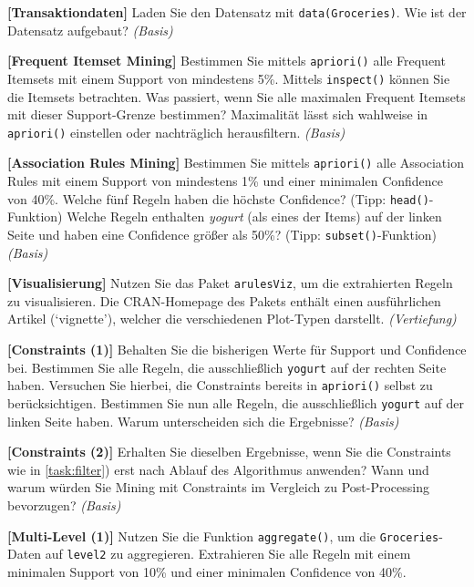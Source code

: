 \documentclass[headinclude,headsepline]{scrartcl}
\newcommand{\taskcategory}[1]{{\color[HTML]{800000}\emph{(#1)}}}
\newcommand{\taskname}[1]{\textbf{[#1]}}
\newcommand{\code}[1]{{\color[HTML]{000080}\texttt{#1}}}
\begin{document}
\begin{compactenum}[a)]\itemsep10pt
	\item
	\taskname{Transaktiondaten}
	Laden Sie den Datensatz mit \code{data(Groceries)}.
	Wie ist der Datensatz aufgebaut?
	\taskcategory{Basis}
	\item
	\taskname{Frequent Itemset Mining}
	Bestimmen Sie mittels \code{apriori()} alle Frequent Itemsets mit einem Support von mindestens 5\%.
	Mittels \code{inspect()} können Sie die Itemsets betrachten.
	Was passiert, wenn Sie alle maximalen Frequent Itemsets mit dieser Support-Grenze bestimmen?
	Maximalität lässt sich wahlweise in \code{apriori()} einstellen oder nachträglich herausfiltern.
	\taskcategory{Basis}
	\item
	\label{task:filter}
	\taskname{Association Rules Mining}
	Bestimmen Sie mittels \code{apriori()} alle Association Rules mit einem Support von mindestens 1\% und einer minimalen Confidence von 40\%.
	Welche fünf Regeln haben die höchste Confidence?
	(Tipp: \code{head()}-Funktion)
	Welche Regeln enthalten \textit{yogurt} (als eines der Items) auf der linken Seite und haben eine Confidence größer als 50\%?
	(Tipp: \code{subset()}-Funktion)
	\taskcategory{Basis}
	\item
	\taskname{Visualisierung}
	Nutzen Sie das Paket \code{arulesViz}, um die extrahierten Regeln zu visualisieren.
	Die CRAN-Homepage des Pakets enthält einen ausführlichen Artikel (`vignette'), welcher die verschiedenen Plot-Typen darstellt.
	\taskcategory{Vertiefung}
	\item
	\taskname{Constraints (1)}
	Behalten Sie die bisherigen Werte für Support und Confidence bei.
	Bestimmen Sie alle Regeln, die ausschließlich \code{yogurt} auf der rechten Seite haben.
	Versuchen Sie hierbei, die Constraints bereits in \code{apriori()} selbst zu berücksichtigen.
	Bestimmen Sie nun alle Regeln, die ausschließlich \code{yogurt} auf der linken Seite haben.
	Warum unterscheiden sich die Ergebnisse?
	\taskcategory{Basis}
	\item
	\taskname{Constraints (2)}
	Erhalten Sie dieselben Ergebnisse, wenn Sie die Constraints wie in \ref{task:filter}) erst nach Ablauf des Algorithmus anwenden?
	Wann und warum würden Sie Mining mit Constraints im Vergleich zu Post-Processing bevorzugen?
	\taskcategory{Basis}
	\item
	\taskname{Multi-Level (1)}
	Nutzen Sie die Funktion \code{aggregate()}, um die \code{Groceries}-Daten auf \code{level2} zu aggregieren.
	Extrahieren Sie alle Regeln mit einem minimalen Support von 10\% und einer minimalen Confidence von 40\%.

\end{compactenum}
\end{document}
